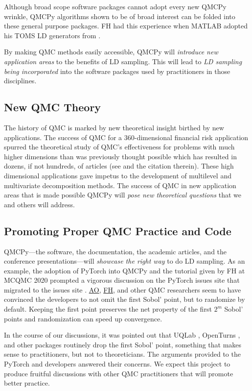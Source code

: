 \documentclass[11pt]{NSFamsart}
\newcommand{\FH}{\hyperlink{FHlink}{FH}\xspace}
\newcommand{\AO}{\hyperlink{AOlink}{AO}\xspace}
\begin{document}
Although broad scope software packages cannot adopt every new QMCPy wrinkle, QMCPy algorithms shown to be of broad interest can be folded into these general purpose packages.  FH had this experience when MATLAB adopted his TOMS LD generators from \cite{HonHic00a}.

By making QMC methods easily accessible, QMCPy will \emph{introduce new application areas} to the benefits of LD sampling.  This will lead to \emph{LD sampling being incorporated} into the software packages used by practitioners in those disciplines.  

\subsection{New QMC Theory}
The history of QMC is marked by new theoretical insight birthed by new applications.  The success of QMC for a $360$-dimensional financial risk application \cite{PasTra95} spurred the theoretical study of QMC's effectiveness for problems with much higher dimensions than was previously thought possible which has resulted in dozens, if not hundreds, of articles (see \cite{NovWoz10a,DicEtal14a} and the citation therein).  These high dimensional applications gave impetus to the development of multilevel \cite{Gil15a} and multivariate decomposition \cite{KuoEtal17a} methods.  The success of QMC in new application areas that is made possible QMCPy will \emph{pose new theoretical questions} that we and others will address.

\subsection{Promoting Proper QMC Practice and Code}
QMCPy---the software, the documentation, the academic articles, and the conference presentations---will \emph{showcase the right way} to do LD sampling.  As an example, the adoption of PyTorch into QMCPy and the tutorial given by FH at MCQMC 2020 \cite{MCQMC2020QMCPyTut} prompted a vigorous discussion on the PyTorch issues site \cite{PyTorchFirstPt2020a} that migrated to the  issues site \cite{scipySobol2020a}.  \AO, \FH, and other QMC researchers seem to have convinced the developers to not omit the first Sobol' point, but to randomize by default.  Keeping the first point preserves the net property of the first $2^m$ Sobol' points and randomization can speed up convergence.  

In the course of our discussions, it was pointed out that UQLab \cite{UQLab}, OpenTurns \cite{OpenTURNS}, and other packages routinely drop the first Sobol' point, something that makes sense to practitioners, but not to theoreticians.  The arguments provided to the PyTorch and  developers answered their concerns.  We expect this project to produce fruitful discussions with other QMC practitioners that will promote better practice.
\end{document}
